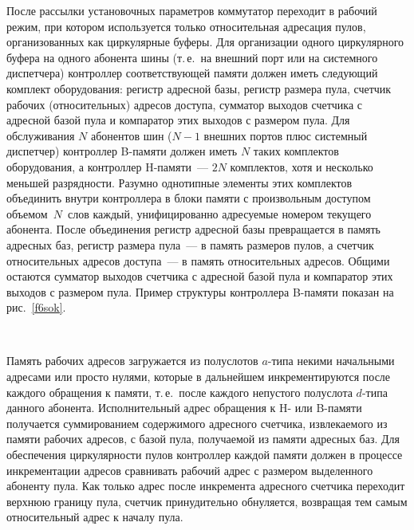 \begin{multicols}{2}
    После рассылки установочных параметров коммутатор переходит в рабочий режим, при
котором используется только относительная адресация пулов, организованных как
циркулярные буферы. Для организации одного циркулярного буфера на одного абонента шины
(т.\,е.\ на внешний порт или на сис\-тем\-но\-го диспетчера) контроллер со\-от\-вет\-ст\-ву\-ющей памяти
должен иметь следующий комплект оборудования: регистр адресной базы, \mbox{регистр} размера
пула, счетчик рабочих (относительных) адресов до\-сту\-па, сумматор выходов счетчика с
адресной базой пула и компаратор этих выходов с размером пула. Для обслуживания $N$
абонентов шин ($N-1$ внешних портов плюс сис\-тем\-ный диспетчер) контроллер B-памяти
должен иметь $N$ таких комплектов оборудования, а контроллер H-па\-мя\-ти~--- $2N$
комплектов, хотя и несколько меньшей раз\-ряд\-ности. Разумно однотипные элементы этих
комплектов объединить внутри контроллера в блоки памяти с произвольным доступом объемом~$N$~слов 
каж\-дый, унифицированно адресуемые номером текущего абонента. После
объединения регистр адресной базы превращается в память адресных баз, регистр размера
пула~--- в память размеров пулов, а счетчик относительных адресов доступа~--- в память
относительных адресов. Общими остаются сумматор выходов счетчика с адресной базой пула и
компаратор этих выходов с размером пула. Пример структуры контроллера B-па\-мя\-ти показан
на рис.~\ref{f6sok}.
{

}

\begin{figure*} %
\vspace*{1pt}
\begin{center}
\mbox{%
\epsfxsize=158.157mm
}
\end{center}
\vspace*{-9pt}
    \end{figure*}

    Память рабочих адресов загружается из полуслотов $a$-типа некими начальными адресами
или просто нулями, которые в дальнейшем инкрементируются после каждого обращения к
памяти, т.\,е.\ после каждого непустого полуслота $d$-типа данного абонента.
Исполнительный адрес обращения к H- или B-памяти получается суммированием содержимого
адресного счетчика, извлекаемого из памяти рабочих адресов, с базой пула, получаемой из
памяти адресных баз. Для обеспечения циркулярности пулов контроллер каждой памяти
должен в процессе инкрементации адресов сравнивать рабочий адрес с размером выделенного
абоненту пула. Как только адрес после инкремента адресного счетчика переходит верхнюю
границу пула, счетчик принудительно обнуляется, возвращая тем самым относительный адрес к
началу пула.


\end{multicols}
